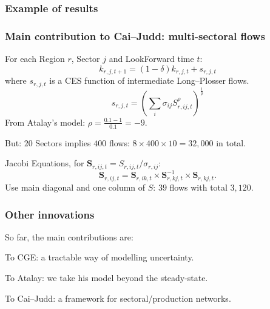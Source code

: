 \documentclass[handout,english]{beamer}
\begin{document}
\begin{frame}
  \frametitle{Example of results}
  
\end{frame}
\begin{frame}\thispagestyle{empty}
  \frametitle{Main contribution to Cai--Judd: multi-sectoral flows}
  For each Region $r$, Sector $j$ and LookForward time $t$:
  \[
    k_{r, j, t + 1} = (1 - \delta) k_{r, j, t} + s_{r, j, t}
  \]
  where $s_{r, j, t}$ is a CES function of intermediate Long--Plosser flows.
  \[
    s_{r, j, t} = \left(\sum_{i} \sigma_{i j} S_{r, i j, t} ^ {\rho} \right)
      ^ {\frac{1}{\rho}}
  \]
  From Atalay's model: $\rho = \frac{0.1 - 1}{0.1} = -9$.

  But: $20$ Sectors implies $400$ flows: $8 \times 400 \times 10 = 32,000$ in 
  total.

  Jacobi Equations, for $\mathbf{S}_{r, ij, t} = S_{r, ij, t} / \sigma_{r, ij}$:
    \[
      \mathbf{S}_{r, ij, t} = \mathbf{S}_{r, ik, t} \times
      \mathbf{S}_{r, kj, t}^{-1} \times \mathbf{S}_{r, kj, t} .
    \]
  Use main diagonal and one column of $S$: $39$ flows with total $3,120$.
\end{frame}
\begin{frame}
  \frametitle{Other innovations}
So far, the main contributions are:

To CGE: a tractable way of modelling uncertainty.

To Atalay: we take his model beyond the steady-state.

To Cai--Judd: a framework for sectoral/production networks.

\end{frame}
\end{document}

